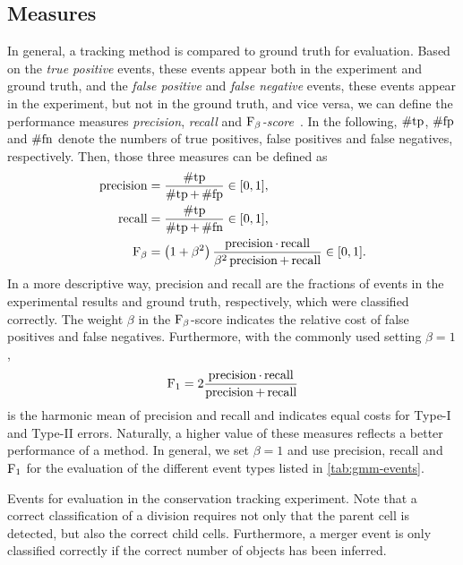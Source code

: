 \subsection{Measures}
\label{subsec:gmm-measures}
In general, a tracking method is compared to ground truth for evaluation. Based on the \emph{true
    positive} events, \ie these events appear both in the experiment and ground truth, and the
\emph{false positive} and \emph{false negative} events, \ie these events appear in the experiment,
but not in the ground truth, and vice versa, we can define the performance measures
\emph{precision}, \emph{recall} and
\emph{$\operatorname{F}_\beta$-score}~\citep{powers_07_evaluation,makhoul_99_performance}. In the
following, $\operatorname{\#tp}$, $\operatorname{\#fp}$ and $\operatorname{\#fn}$ denote the numbers of true positives, false positives and false
negatives, respectively. Then, those three measures can be defined as
\begin{align}
    \operatorname{precision} &= \frac{\operatorname{\#tp}}{\operatorname{\#tp}+\operatorname{\#fp}} \in [0,1], \\
    \operatorname{recall} &= \frac{\operatorname{\#tp}}{\operatorname{\#tp}+\operatorname{\#fn}} \in [0,1], \\
    \operatorname{F}_\beta &= \left(1+\beta^2\right)\frac{\operatorname{precision}\cdot\operatorname{recall}}{\beta^2\operatorname{precision}+\operatorname{recall}} \in [0,1].
\end{align}
In a more descriptive way, precision and recall are the fractions of events in the experimental
results and ground truth, respectively, which were classified correctly. The weight $\beta$ in the
$\operatorname{F}_\beta$-score indicates the relative cost of false positives and false
negatives. Furthermore, with the commonly used setting $\beta=1$,
\begin{align}
    \operatorname{F}_{1} = 2\frac{\operatorname{precision}\cdot\operatorname{recall}}{\operatorname{precision}+\operatorname{recall}}
\end{align}
is the harmonic mean of precision and recall and indicates equal costs for Type-I and Type-II
errors. Naturally, a higher value of these measures reflects a better performance of a method. In
general, we set $\beta=1$ and use precision, recall and $\operatorname{F}_{1}$ for the evaluation of the
different event types listed in \cref{tab:gmm-events}.
\begin{table}
    \centering
    
    \caption[Events in the conservation tracking]{Events for evaluation in the conservation tracking
        experiment. Note that a correct classification of a division requires not only that the
        parent cell is detected, but also the correct child cells. Furthermore, a merger event is
        only classified correctly if the correct number of objects has been inferred.}
    \label{tab:gmm-events}
\end{table}

